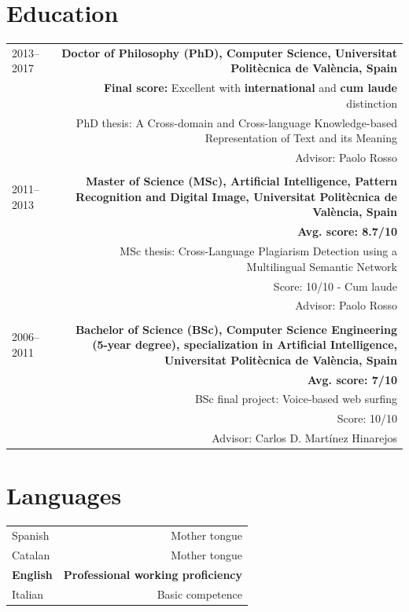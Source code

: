 \documentclass[10pt]{article}
\begin{document}
\section*{Education}
\begin{tabular}{L!{\VRule}R}
	2013--2017 &{\bf Doctor of Philosophy (PhD), Computer Science, Universitat Polit{\`e}cnica de Val{\`e}ncia, Spain}\vspace{5pt}\\
	&\textbf{Final score:} Excellent  with \textbf{international} and \textbf{cum laude} distinction\\
	&\scriptsize{PhD thesis: A Cross-domain and Cross-language Knowledge-based Representation of Text and its Meaning}\\
	&\scriptsize{Advisor: Paolo Rosso}\\
	&\\
	2011--2013&{\bf Master of Science (MSc), Artificial Intelligence, Pattern Recognition and Digital Image, Universitat Polit{\`e}cnica de Val{\`e}ncia, Spain}\vspace{5pt}\\
	&\bf Avg. score: 8.7/10\\
	&\scriptsize{MSc thesis: Cross-Language Plagiarism Detection using a Multilingual Semantic Network}\\
	&\scriptsize{Score: 10/10  -  Cum laude}\\
	&\scriptsize{Advisor: Paolo Rosso}\\
	&\\
	2006--2011& \bf Bachelor of Science (BSc), Computer Science Engineering (5-year degree), specialization in Artificial Intelligence, Universitat Polit{\`e}cnica de Val{\`e}ncia, Spain\vspace{5pt}\\
	&\bf Avg. score: 7/10\\
	&\scriptsize{BSc final project: Voice-based web surfing}\\
	&\scriptsize{Score: 10/10}\\
	&\scriptsize{Advisor: Carlos D. Mart\'inez Hinarejos}\\ 
\end{tabular}

\section*{Languages}
\begin{tabular}{L!{\VRule}R}
Spanish&Mother tongue\\
Catalan&Mother tongue\\
{\bf English}&{\bf Professional working proficiency}\\
Italian&Basic competence\\
\end{tabular}
\end{document}
